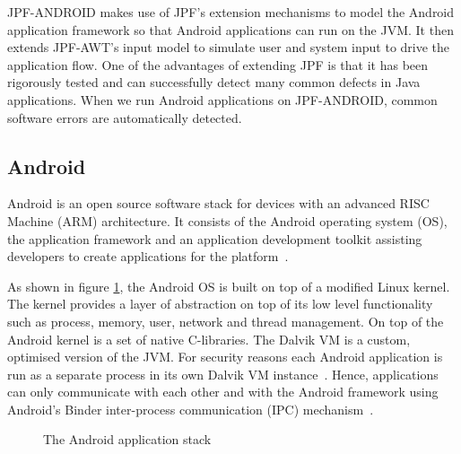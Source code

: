 \documentclass{acm_proc_article-sp}
\begin{document}
JPF-ANDROID makes use of JPF's extension mechanisms to model the Android application framework so that Android applications can run on the
JVM. It then extends JPF-AWT's input model to simulate user and system input to drive the application flow. One of the advantages of
extending JPF is that it has been rigorously tested and can successfully detect many common defects in Java applications. When we run
Android applications on JPF-ANDROID, common software errors are automatically detected.


\subsection{Android}
Android is an open source software stack for devices with an advanced RISC Machine (ARM) architecture.
It consists of the Android operating system (OS), the application framework and an application development toolkit assisting developers to create
applications for the platform~\cite{AndroidDocs}.

As shown in figure \ref{fig:android}, the Android OS is built on top of a modified Linux kernel. The kernel provides a layer of abstraction
on top of its low level functionality such as process, memory, user, network and thread management. On top of the Android kernel is a set of
native C-libraries. The Dalvik VM is a custom, optimised version of the JVM. For security reasons each Android application is run as a
separate process in its own Dalvik VM instance~\cite{AndroidSecurity}.  Hence, applications can only communicate with each other and with
the Android framework using Android's Binder inter-process communication (IPC) mechanism~\cite{Binder}. 

\begin{figure}
\centering
{}
\caption{The Android application stack~\cite{systemserver}}
\label{fig:android}
\end{figure}
\end{document}
